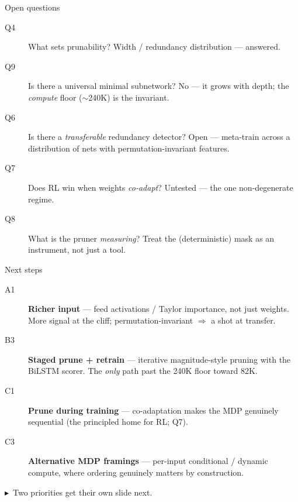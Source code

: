 \documentclass[10pt,aspectratio=169]{beamer}
\newcommand{\tk}[1]{{\scriptsize \textcolor{accent}{$\blacktriangleright$}\ #1}}
\begin{document}
\begin{frame}{Open questions}
  \begin{description}
    \item[Q4] What sets prunability? \textcolor{good}{Width / redundancy distribution} --- answered.
    \item[Q9] Is there a universal minimal subnetwork? \textcolor{good}{No} --- it grows with depth; the \emph{compute} floor ($\sim$240K) is the invariant.
    \item[Q6] Is there a \emph{transferable} redundancy detector? Open --- meta-train across a distribution of nets with permutation-invariant features.
    \item[Q7] Does RL win when weights \emph{co-adapt}? Untested --- the one non-degenerate regime.
    \item[Q8] What is the pruner \emph{measuring}? Treat the (deterministic) mask as an instrument, not just a tool.
  \end{description}
\end{frame}

\begin{frame}{Next steps}
  \begin{description}
    \item[A1] \textbf{Richer input} --- feed activations / Taylor importance, not just weights. More signal at the cliff; permutation-invariant $\Rightarrow$ a shot at transfer.
    \item[B3] \textbf{Staged prune + retrain} --- iterative magnitude-style pruning with the BiLSTM scorer. The \emph{only} path past the 240K floor toward 82K.
    \item[C1] \textbf{Prune during training} --- co-adaptation makes the MDP genuinely sequential (the principled home for RL; Q7).
    \item[C3] \textbf{Alternative MDP framings} --- per-input conditional / dynamic compute, where ordering genuinely matters by construction.
  \end{description}
  \vspace{0.3em}
  \tk{Two priorities get their own slide next.}
\end{frame}
\end{document}
